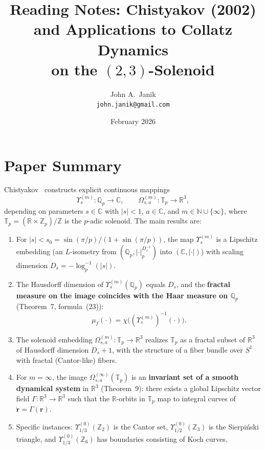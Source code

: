 \documentclass[11pt,a4paper]{article}
\title{\textbf{Reading Notes: Chistyakov (2002)\\
and Applications to Collatz Dynamics\\
on the $(2,3)$-Solenoid}}
\author{John A.\ Janik\\
\texttt{john.janik@gmail.com}}
\date{February 2026}
\newcommand{\Z}{\mathbb{Z}}
\newcommand{\R}{\mathbb{R}}
\newcommand{\C}{\mathbb{C}}
\newcommand{\Q}{\mathbb{Q}}
\newcommand{\N}{\mathbb{N}}
\newcommand{\T}{\mathbb{T}}
\newcommand{\Zp}{\Z_p}
\newcommand{\Qp}{\Q_p}
\theoremstyle{plain}
\theoremstyle{definition}
\begin{document}
\maketitle

\tableofcontents
\newpage

\section{Paper Summary}

Chistyakov~\cite{Chistyakov2002} constructs explicit continuous mappings
\begin{equation}
    \Upsilon_s^{(m)}: \Qp \to \C, \qquad
    \Omega_{s,a}^{(m)}: \T_p \to \R^3,
\end{equation}
depending on parameters $s \in \C$ with $|s| < 1$, $a \in \C$, and $m \in \N \cup \{\infty\}$, where $\T_p = (\R \times \Zp)/\Z$ is the $p$-adic solenoid. The main results are:

\begin{enumerate}[label=(\roman*)]
    \item For $|s| < s_0 = \sin(\pi/p)/(1 + \sin(\pi/p))$, the map $\Upsilon_s^{(m)}$ is a Lipschitz embedding (an $L$-isometry from $(\Qp, |\cdot|_p^{D_s^{-1}})$ into $(\C, |\cdot|)$) with scaling dimension $D_s = -\log_p^{-1}(|s|)$.

    \item The Hausdorff dimension of $\Upsilon_s^{(m)}(\Qp)$ equals $D_s$, and the \textbf{fractal measure on the image coincides with the Haar measure on $\Qp$} (Theorem~7, formula~(23)):
    \begin{equation}\label{eq:haar-fractal}
        \mu_f(\cdot) = \chi\bigl((\Upsilon_s^{(m)})^{-1}(\cdot)\bigr).
    \end{equation}

    \item The solenoid embedding $\Omega_{s,a}^{(m)}: \T_p \to \R^3$ realizes $\T_p$ as a fractal subset of $\R^3$ of Hausdorff dimension $D_s + 1$, with the structure of a fiber bundle over $S^1$ with fractal (Cantor-like) fibers.

    \item For $m = \infty$, the image $\Omega_{s,a}^{(\infty)}(\T_p)$ is an \textbf{invariant set of a smooth dynamical system} in $\R^3$ (Theorem~9): there exists a global Lipschitz vector field $\Gamma: \R^3 \to \R^3$ such that the $\R$-orbits in $\T_p$ map to integral curves of $\dot{\mathbf{r}} = \Gamma(\mathbf{r})$.

    \item Specific instances: $\Upsilon_{1/3}^{(0)}(\Z_2)$ is the Cantor set, $\Upsilon_{1/2}^{(0)}(\Z_3)$ is the Sierpi\'nski triangle, and $\Upsilon_{1/3}^{(0)}(\Z_6)$ has boundaries consisting of Koch curves.
\end{enumerate}
\end{document}
